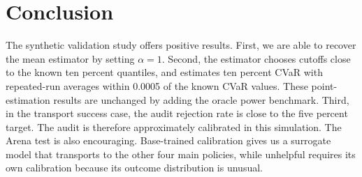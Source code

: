 \documentclass[11pt]{article}
\begin{document}
\section{Conclusion}

The synthetic validation study offers positive results.  First, we are able to
recover the mean estimator by setting \(\alpha=1\). Second, the estimator
chooses cutoffs close to the known ten percent quantiles, and estimates ten
percent CVaR with repeated-run averages within 0.0005 of the known CVaR values.
These point-estimation results are unchanged by adding the oracle power
benchmark.  Third, in the transport success case, the audit rejection rate is
close to the five percent target. The audit is therefore
approximately calibrated in this simulation. The Arena test is also encouraging. Base-trained calibration gives us a surrogate model that
transports to the other four main policies, while unhelpful
requires its own calibration because its outcome distribution is unusual.
\end{document}
